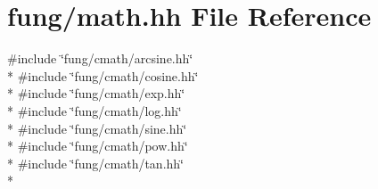 \hypertarget{math_8hh}{}\section{fung/math.hh File Reference}
\label{math_8hh}
{\ttfamily \#include \char`\"{}fung/cmath/arcsine.\+hh\char`\"{}}\\*
{\ttfamily \#include \char`\"{}fung/cmath/cosine.\+hh\char`\"{}}\\*
{\ttfamily \#include \char`\"{}fung/cmath/exp.\+hh\char`\"{}}\\*
{\ttfamily \#include \char`\"{}fung/cmath/log.\+hh\char`\"{}}\\*
{\ttfamily \#include \char`\"{}fung/cmath/sine.\+hh\char`\"{}}\\*
{\ttfamily \#include \char`\"{}fung/cmath/pow.\+hh\char`\"{}}\\*
{\ttfamily \#include \char`\"{}fung/cmath/tan.\+hh\char`\"{}}\\*
